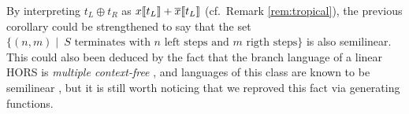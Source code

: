\begin{remark}
	By interpreting  $t_L \oplus t_R$ as $x \llbracket t_L\rrbracket + \overline x \llbracket t_L\rrbracket$ (cf.~Remark \ref{rem:tropical}), the previous corollary could be strengthened to say that the set
	$\{(n,m) \mid \:  S \text{ terminates with } n \text{ left steps and } m \text{ rigth steps}\}$ is also semilinear.
	This could also been deduced by the fact that the branch language of a linear HORS is \emph{multiple context-free} \cite{DBLP:conf/mfcs/ClairambaultM19}, and languages of this class are known to be semilinear \cite{DBLP:conf/acl/Vijay-ShankerWJ87}, but it is still worth noticing that we reproved this fact via generating functions.
\end{remark}
%
%
%
%
%
%
%

